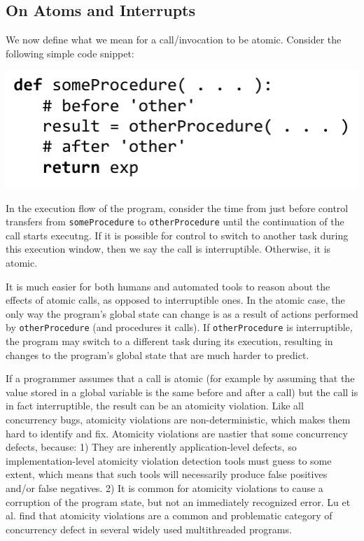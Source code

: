 \documentclass[9pt,preprint]{sigplanconf}
\begin{document}
\subsection{On Atoms and Interrupts}

We now define what we mean for a call/invocation to be atomic.
Consider the following simple code snippet\footnotemark{}:

\noindent
\includegraphics[scale=0.7]{trivial_call}


In the execution flow of the program, consider the time from just before control transfers from \texttt{someProcedure} to \texttt{otherProcedure} until the continuation of the call starts executng.
If it is possible for control to switch to another task during this execution window, then we say the call is interruptible.
Otherwise, it is atomic.

It is much easier for both humans and automated tools to reason about the effects of atomic calls, as opposed to interruptible ones.
In the atomic case, the only way the program's global state can change is as a result of actions performed by \texttt{otherProcedure} (and procedures it calls).
If \texttt{otherProcedure} is interruptible, the program may switch to a different task during its execution, resulting in changes to the program's global state that are much harder to predict.

If a programmer assumes that a call is atomic (for example by assuming that the value stored in a global variable is the same before and after a call) but the call is in fact interruptible, the result can be an atomicity violation.
Like all concurrency bugs, atomicity violations are non-deterministic, which makes them hard to identify and fix.
Atomicity violations are nastier that some concurrency defects, because:
1) They are inherently application-level defects, so implementation-level atomicity violation detection tools must guess to some extent, which means that such tools will necessarily produce false positives and/or false negatives.
2) It is common for atomicity violations to cause a corruption of the program state, but not an immediately recognized error.
Lu et al. \cite{Lu2008} find that atomicity violations are a common and problematic category of concurrency defect in several widely used multithreaded programs.
\end{document}
